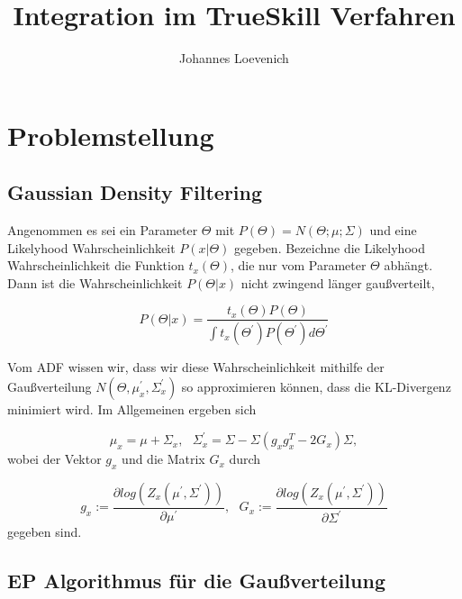 \documentclass[12pt,a4paper]{scrartcl}
\title{Integration im TrueSkill Verfahren}
\author{Johannes Loevenich}
\numberwithin{equation}{section}
\begin{document}
\maketitle

\begin{abstract}

\end{abstract}

\section{Problemstellung}

\subsection{Gaussian Density Filtering}
Angenommen es sei ein Parameter $\varTheta$ mit $P(\varTheta) = N(\varTheta; \mu;\varSigma)$ und eine Likelyhood Wahrscheinlichkeit $P(x|\varTheta)$ gegeben. 
Bezeichne die Likelyhood Wahrscheinlichkeit die Funktion $t_x(\varTheta)$, die nur vom Parameter $\varTheta$ abhängt. 
Dann ist die Wahrscheinlichkeit $P(\varTheta|x)$ nicht zwingend länger gaußverteilt, 

\begin{equation}
  P(\varTheta|x) = \frac{t_x(\varTheta)P(\varTheta)}{\int t_x(\varTheta^{'})P(\varTheta^{'})d\varTheta^{'}}
\end{equation}

Vom ADF wissen wir, dass wir diese Wahrscheinlichkeit mithilfe der Gaußverteilung $N(\varTheta,\mu_x^{'},\varSigma_x^{'})$ so approximieren können, dass die KL-Divergenz minimiert wird. 
Im Allgemeinen ergeben sich 

\begin{equation}
 \mu_x = \mu + \varSigma_x, \text{			} \varSigma_x^{'} = \varSigma - \varSigma(g_xg_x^T - 2G_x)\varSigma,
\end{equation}
 wobei der Vektor \textbf{$g_x$} und die Matrix $G_x$ durch  

 \begin{equation}
  g_x := \frac{\partial log(Z_x(\mu^{'},\varSigma^{'}))}{\partial \mu^{'}}, \text{			} G_x := \frac{\partial log(Z_x(\mu^{'},\varSigma^{'}))}{\partial \varSigma^{'}}
 \end{equation}
gegeben sind. 

\subsection{EP Algorithmus für die Gaußverteilung}
\end{document}
